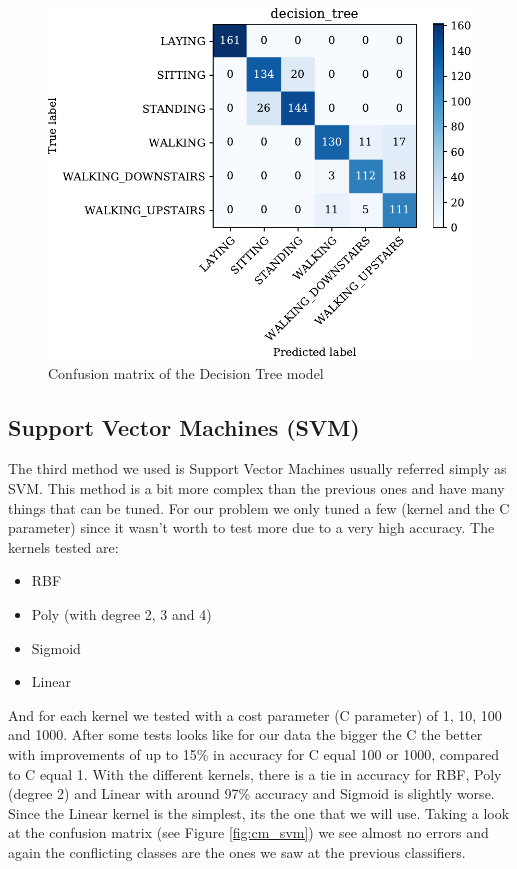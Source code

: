 \documentclass[conference,a4paper]{IEEEtran}
\begin{document}
\begin{figure}[htbp]
    \centering
    \includegraphics[width=0.8\columnwidth]{../plots/cm_decision_tree.pdf}
    \caption{Confusion matrix of the Decision Tree model}
    \label{fig:cm_dt}
\end{figure}

\subsection{Support Vector Machines (SVM)}
The third method we used is Support Vector Machines usually referred simply as SVM. This method is a bit more complex than the previous ones and have many things that can be tuned. For our problem we only tuned a few (kernel and the C parameter) since it wasn't worth to test more due to a very high accuracy. The kernels tested are:
\begin{itemize}
    \item RBF
    \item Poly (with degree 2, 3 and 4)
    \item Sigmoid
    \item Linear
\end{itemize}
And for each kernel we tested with a cost parameter (C parameter) of 1, 10, 100 and 1000. After some tests looks like for our data the bigger the C the better with improvements of up to 15\% in accuracy for C equal 100 or 1000, compared to C equal 1. With the different kernels, there is a tie in accuracy for RBF, Poly (degree 2) and Linear with around 97\% accuracy and Sigmoid is slightly worse. Since the Linear kernel is the simplest, its the one that we will use. Taking a look at the confusion matrix (see Figure \ref{fig:cm_svm}) we see almost no errors and again the conflicting classes are the ones we saw at the previous classifiers.
\end{document}
